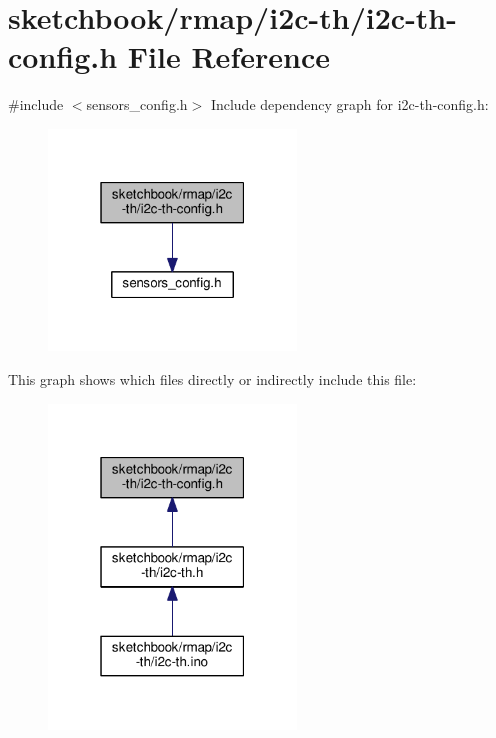 \hypertarget{i2c-th-config_8h}{}\section{sketchbook/rmap/i2c-\/th/i2c-\/th-\/config.h File Reference}
\label{i2c-th-config_8h}
{\ttfamily \#include $<$sensors\+\_\+config.\+h$>$}\newline
Include dependency graph for i2c-\/th-\/config.h\+:
\nopagebreak
\begin{figure}[H]
\begin{center}
\leavevmode
\includegraphics[width=187pt]{i2c-th-config_8h__incl}
\end{center}
\end{figure}
This graph shows which files directly or indirectly include this file\+:
\nopagebreak
\begin{figure}[H]
\begin{center}
\leavevmode
\includegraphics[width=187pt]{i2c-th-config_8h__dep__incl}
\end{center}
\end{figure}
